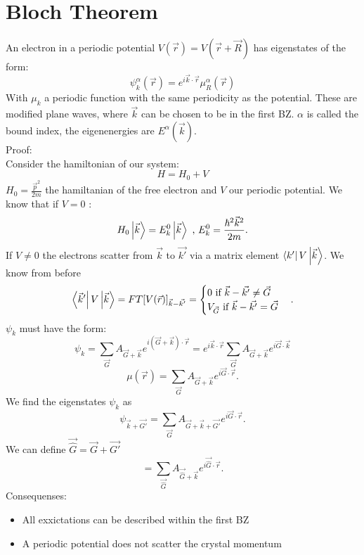 \documentclass{report}
\begin{document}
\section{Bloch Theorem}
An electron in a periodic potential $V(\vec{r}) = V(\vec{r} + \vec{R})$ has eigenstates of the form: \[
	\psi_k^{\alpha}(\vec{r}) = e^{i \vec{k}\cdot \vec{r}} \mu_R^{\alpha}(\vec{r})
\] With $\mu_k$ a periodic function with the same periodicity as the potential. These are modified plane waves, where $\vec{k}$ can be chosen to be in the first BZ. $\alpha$ is called the bound index, the eigenenergies are $E^{\alpha}(\vec{k})$.\\
Proof:\\
Consider the hamiltonian of our system: \[
H = H_0 + V
\] $H_0 = \frac{\vec{p}^2}{2m}$ the hamiltanian of the free electron and $V$ our periodic potential. We know that if $V = 0$ : \[
H_0\ket{\vec{k}} = E_k^0 \ket{\vec{k}} \text{  ,  } E_k^0= \frac{\hbar^2 \vec{k}^2}{2m}
.\] If $V \neq 0$ the electrons scatter from $\vec{k}$ to $\vec{k'}$ via a matrix element $\bra{k'} V \ket{\vec{k}} $. We know from before \[
\bra{\vec{k}'} V \ket{\vec{k}} = FT[V(\vec{r})]_{\vec{k} - \vec{k'}} =  \begin{cases}
	0 \text{ if } \vec{k} - \vec{k'} \neq \vec{G} \\
	V_{\vec{G}} \text{ if } \vec{k} - \vec{k'} = \vec{G}
\end{cases}
.\]  $\psi_k$ must have the form: \[
\psi_k = \sum_{\vec{G}} A_{\vec{G}+\vec{k}} e^{i\left( \vec{G} + \vec{k} \right) \cdot \vec{r}} = e^{i\vec{k}\cdot \vec{r}} \sum_{\vec{G}} A_{\vec{G} + \vec{k}} e^{i\vec{G}\cdot\vec{k}}
\]\[
\mu(\vec{r}) = \sum_{\vec{G}} A_{\vec{G} + \vec{k}} e^{i\vec{G}\cdot\vec{r}}
.\] We find the eigenstates $\psi_k$ as \[
\psi_{\vec{k} + \vec{G'}} = \sum_{\vec{G}} A_{\vec{G} + \vec{k} + \vec{G'}} e^{i\vec{G}\cdot \vec{r}} 
.\]  We can define $\vec{\hat{G}} = \vec{G} + \vec{G'}$ \[
= \sum_{\vec{\hat{G}}} A_{\vec{\hat{G}} + \vec{k}} e^{i \vec{\hat{G}} \cdot \vec{r}}
.\] Consequenses: 
\begin{itemize}
	\item All exxictations can be described within the first BZ
	\item A periodic potential does not scatter the crystal momentum
\end{itemize}
\end{document}
